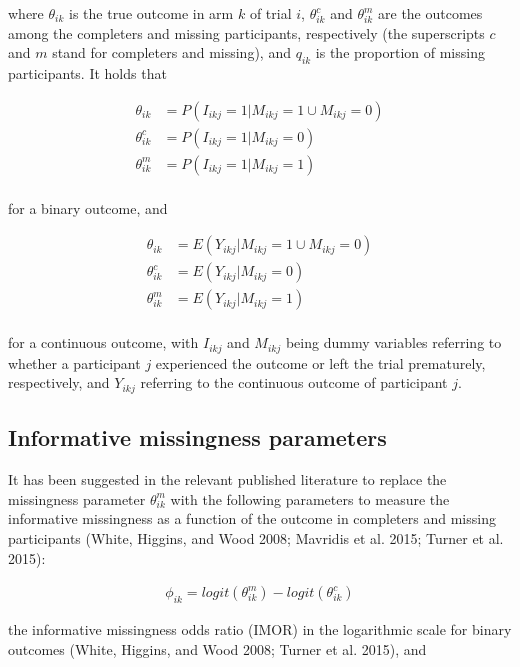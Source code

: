 where \(\theta_{ik}\) is the true outcome in arm \(k\) of trial \(i\), \(\theta^{c}_{ik}\)
and \(\theta^{m}_{ik}\) are the outcomes among the completers and missing participants,
respectively (the superscripts \(c\) and \(m\) stand for completers and missing), and
\(q_{ik}\) is the proportion of missing participants. It holds that

\[\begin{aligned}
\theta_{ik} &= P(I_{ikj} = 1 | M_{ikj} = 1 \cup M_{ikj} = 0) \\
\theta^{c}_{ik} &= P(I_{ikj} = 1 | M_{ikj} = 0) \\
\theta^{m}_{ik} &= P(I_{ikj} = 1 | M_{ikj} = 1) \\
\end{aligned}\]

for a binary outcome, and

\[\begin{aligned}
\theta_{ik} &= E(Y_{ikj} | M_{ikj} = 1 \cup M_{ikj} = 0) \\
\theta^{c}_{ik} &= E(Y_{ikj} | M_{ikj} = 0) \\
\theta^{m}_{ik} &= E(Y_{ikj} | M_{ikj} = 1) \\
\end{aligned}\]

for a continuous outcome, with \(I_{ikj}\) and \(M_{ikj}\) being dummy variables
referring to whether a participant \(j\) experienced the outcome or left the trial
prematurely, respectively, and \(Y_{ikj}\) referring to the continuous outcome of
participant \(j\).

\hypertarget{informative-missingness-parameters}{%
\subsection{Informative missingness parameters}\label{informative-missingness-parameters}}

It has been suggested in the relevant published literature to replace the missingness
parameter \(\theta^{m}_{ik}\) with the following parameters to measure the informative
missingness as a function of the outcome in completers and missing participants
(White, Higgins, and Wood 2008; Mavridis et al. 2015; Turner et al. 2015):

\[\begin{aligned}
\phi_{ik} = logit(\theta^{m}_{ik}) - logit(\theta^{c}_{ik})
\end{aligned}\]

the informative missingness odds ratio (IMOR) in the logarithmic scale for binary
outcomes (White, Higgins, and Wood 2008; Turner et al. 2015), and


